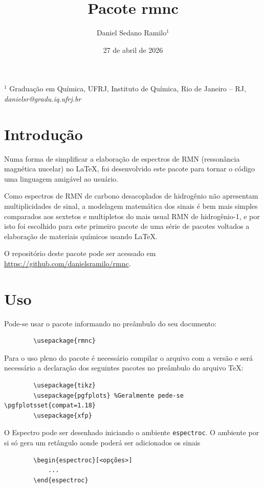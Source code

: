 \documentclass[a4paper, 11pt]{article}
\title{Pacote rmnc}
\author{Daniel Sedano Ramilo$^1$}
\date{27 de abril de 2026}
\begin{document}
	\maketitle
	{\noindent \small $^1$ Graduação em Química, UFRJ, Instituto de Química, Rio de Janeiro – RJ, \textit{danielsr@gradu.iq.ufrj.br}}
	
	\section{Introdução}
	Numa forma de simplificar a elaboração de espectros de RMN (ressonância magnética nucelar) no \LaTeX, foi desenvolvido este pacote para tornar o código uma linguagem amigável ao usuário. 
	
	Como espectros de RMN de carbono desacoplados de hidrogênio não apresentam multiplicidades de sinal, a modelagem matemática dos sinais é bem mais simples comparados aos sextetos e multipletos do mais usual RMN de hidrogênio-1, e por isto foi escolhido para este primeiro pacote de uma série de pacotes voltados a elaboração de materiais químicos usando \LaTeX.
	
	O repositório deste pacote pode ser acessado em  \url{https://github.com/danielsramilo/rmnc}.
	
	\setlength{\parindent}{0pt}
	\setlength{\parskip}{0pt}
	\section{Uso}
	Pode-se usar o pacote informando no preâmbulo do seu documento:
	\begin{verbatim}
		\usepackage{rmnc}
	\end{verbatim}
	
	Para o uso pleno do pacote é necessário compilar o arquivo com a versão \LaTeXe \space e será necessário a declaração dos seguintes pacotes no preâmbulo do arquivo \TeX:
	\begin{verbatim}
		\usepackage{tikz}
		\usepackage{pgfplots} %Geralmente pede-se \pgfplotsset{compat=1.18}
		\usepackage{xfp}
	\end{verbatim}
	
	O Espectro pode ser desenhado iniciando o ambiente \verb|espectroc|. O ambiente por si só gera um retângulo aonde poderá ser adicionados os sinais
	\begin{verbatim}
		\begin{espectroc}[<opções>]
			...
		\end{espectroc}
	\end{verbatim}
	
\end{document}
